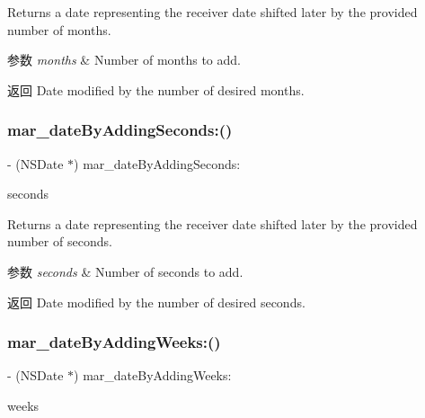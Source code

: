 Returns a date representing the receiver date shifted later by the provided number of months.


\begin{DoxyParams}{参数}
{\em months} & Number of months to add. \\
\hline
\end{DoxyParams}
\begin{DoxyReturn}{返回}
Date modified by the number of desired months. 
\end{DoxyReturn}
\mbox{\label{category_n_s_date_07_m_a_r_e_x_08_a7ba0bc50c7f1d00911827d407dd0e53e}} 
\subsubsection{\texorpdfstring{mar\+\_\+date\+By\+Adding\+Seconds\+:()}{mar\_dateByAddingSeconds:()}}
{\footnotesize\ttfamily -\/ (N\+S\+Date $\ast$) mar\+\_\+date\+By\+Adding\+Seconds\+: \begin{DoxyParamCaption}\item[{(N\+S\+Integer)}]{seconds }\end{DoxyParamCaption}}

Returns a date representing the receiver date shifted later by the provided number of seconds.


\begin{DoxyParams}{参数}
{\em seconds} & Number of seconds to add. \\
\hline
\end{DoxyParams}
\begin{DoxyReturn}{返回}
Date modified by the number of desired seconds. 
\end{DoxyReturn}
\mbox{\label{category_n_s_date_07_m_a_r_e_x_08_a52226cb41d05983b2f105af87b0d7e58}} 
\subsubsection{\texorpdfstring{mar\+\_\+date\+By\+Adding\+Weeks\+:()}{mar\_dateByAddingWeeks:()}}
{\footnotesize\ttfamily -\/ (N\+S\+Date $\ast$) mar\+\_\+date\+By\+Adding\+Weeks\+: \begin{DoxyParamCaption}\item[{(N\+S\+Integer)}]{weeks }\end{DoxyParamCaption}}

